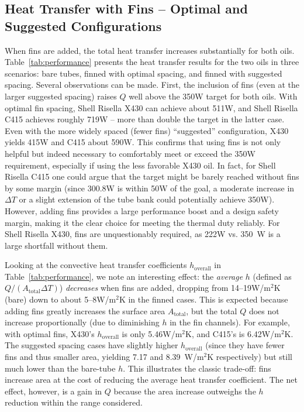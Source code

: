 \documentclass[12pt]{article}
\begin{document}
\subsection{Heat Transfer with Fins – Optimal and Suggested Configurations}
When fins are added, the total heat transfer increases substantially for both oils. Table~\ref{tab:performance} presents the heat transfer results for the two oils in three scenarios: bare tubes, finned with optimal spacing, and finned with suggested spacing. Several observations can be made. First, the inclusion of fins (even at the larger suggested spacing) raises $Q$ well above the 350W target for both oils. With optimal fin spacing, Shell Risella X430 can achieve about 511W, and Shell Risella C415 achieves roughly 719W – more than double the target in the latter case. Even with the more widely spaced (fewer fins) “suggested” configuration, X430 yields 415W and C415 about 590W. This confirms that using fins is not only helpful but indeed necessary to comfortably meet or exceed the 350W requirement, especially if using the less favorable X430 oil. In fact, for Shell Risella C415 one could argue that the target might be barely reached without fins by some margin (since 300.8W is within 50W of the goal, a moderate increase in $\Delta T$ or a slight extension of the tube bank could potentially achieve 350W). However, adding fins provides a large performance boost and a design safety margin, making it the clear choice for meeting the thermal duty reliably. For Shell Risella X430, fins are unquestionably required, as 222W vs. 350~W is a large shortfall without them.

Looking at the convective heat transfer coefficients $h_{\text{overall}}$ in Table~\ref{tab:performance}, we note an interesting effect: the \emph{average} $h$ (defined as $Q/(A_{\text{total}}\Delta T)$) \emph{decreases} when fins are added, dropping from 14–19W/m$^2$K (bare) down to about 5–8W/m$^2$K in the finned cases. This is expected because adding fins greatly increases the surface area $A_{\text{total}}$, but the total $Q$ does not increase proportionally (due to diminishing $h$ in the fin channels). For example, with optimal fins, X430’s $h_{\text{overall}}$ is only 5.46W/m$^2$K, and C415’s is 6.42W/m$^2$K. The suggested spacing cases have slightly higher $h_{\text{overall}}$ (since they have fewer fins and thus smaller area, yielding 7.17 and 8.39~W/m$^2$K respectively) but still much lower than the bare-tube $h$. This illustrates the classic trade-off: fins increase area at the cost of reducing the average heat transfer coefficient. The net effect, however, is a gain in $Q$ because the area increase outweighs the $h$ reduction within the range considered.
\end{document}
